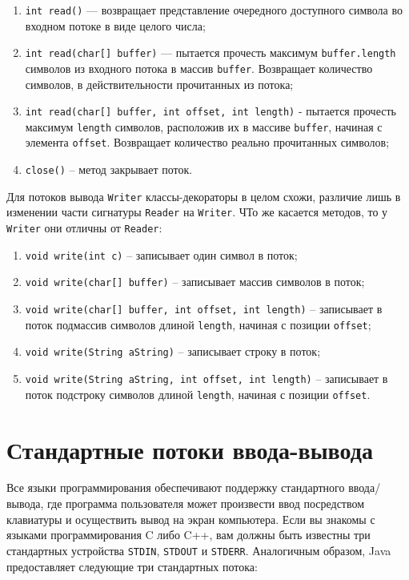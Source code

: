 \begin{enumerate}
    \item \verb|int read()| — возвращает представление очередного доступного символа во входном потоке в виде целого числа;
    \item \verb|int read(char[] buffer)| — пытается прочесть максимум \verb|buffer.length| символов из входного потока в массив \verb|buffer|. Возвращает количество символов, в действительности прочитанных из потока;
    \item \verb|int read(char[] buffer, int offset, int length)| - пытается прочесть максимум \verb|length| символов, расположив их в массиве \verb|buffer|, начиная с элемента \verb|offset|. Возвращает количество реально прочитанных символов;
    \item \verb|close()| – метод закрывает поток.
\end{enumerate}

Для потоков вывода \verb|Writer| классы-декораторы в целом схожи, различие лишь в изменении части сигнатуры \verb|Reader| на \verb|Writer|. ЧТо же касается методов, то у \verb|Writer| они отличны от \verb|Reader|:

\begin{enumerate}
    \item \verb|void write(int c)| – записывает один символ в поток;
    \item \verb|void write(char[] buffer)| – записывает массив символов в поток;
    \item \verb|void write(char[] buffer, int offset, int length)| – записывает в поток подмассив символов длиной \verb|length|, начиная с позиции \verb|offset|;
    \item \verb|void write(String aString)| – записывает строку в поток;
    \item \verb|void write(String aString, int offset, int length)| – записывает в поток подстроку символов длиной \verb|length|, начиная с позиции \verb|offset|.
\end{enumerate}

\section{Стандартные потоки ввода-вывода}

Все языки программирования обеспечивают поддержку стандартного ввода/вывода, где программа пользователя может произвести ввод посредством клавиатуры и осуществить вывод на экран компьютера. Если вы знакомы с языками программирования C либо C++, вам должны быть известны три стандартных устройства \verb|STDIN|, \verb|STDOUT| и \verb|STDERR|. Аналогичным образом, Java предоставляет следующие три стандартных потока:

